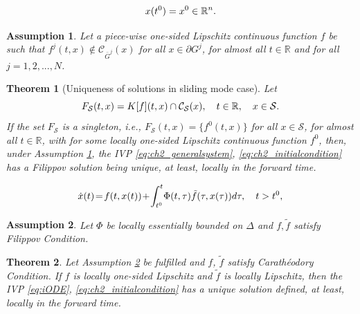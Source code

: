 \documentclass[10pt,a4paper]{amsart}
\newtheorem{assumption}{Assumption}
\newtheorem{theorem}{Theorem}
\newcommand{\R}{\mathbb{R}}
\begin{document}
\begin{equation} \label{eq:ch2_initialcondition}
	x(t^0)=x^0\in \R^n.\vspace{-1mm}
\end{equation} 

\begin{assumption}\label{as:uniq_1}\itshape
	Let  a piece-wise one-sided Lipschitz continuous function $f$ be such that 
		$f^j(t,x)\!\notin\! \mathcal{C}_{\bar G^j}(x)$ for all  $x\!\in\! \partial G^j$,
		for almost all $t\!\in\!\R$ and  for all $j\!=\!1,2,...,N$.
\end{assumption}

\begin{theorem}[\small Uniqueness of solutions in sliding mode case]\label{thm:unique_SM}\itshape
	Let\vspace{-1mm} 
		\begin{equation}
		F_{\mathcal{S}}(t,x)= K[f](t,x)\cap\mathcal{C}_{\mathcal{S}}(x), \quad t\in \R, \quad x\in \mathcal{S}.\vspace{-1mm}
		\end{equation}
 If the set 
  $F_{\mathcal{S}}$ is a singleton, i.e., $F_{\mathcal{S}}(t,x)=\{f^0(t,x)\}$ for all $x\in \mathcal{S}$, for almost all $t\in \R$, with
 for some locally {one-sided} Lipschitz continuous function $f^0$, then,  {under  Assumption \ref{as:uniq_1},}  
  the IVP  \eqref{eq:ch2_generalsystem}, \eqref{eq:ch2_initialcondition}  has a Filippov solution 
   being unique,  at least, locally in the forward time. 	
\end{theorem}

\begin{equation}\label{eq:iODE}
	\dot x(t)\!=\!f(t,x(t))\!+\!\int^t_{t^0} \!\Phi(t,\tau) \tilde f(\tau,x(\tau)) d\tau, \quad t>t^0,\vspace{-1mm}
\end{equation}

\begin{assumption}\label{as:ex_IDE}\itshape
		Let $\Phi$ be locally essentially bounded on $\Delta$ and $f,\tilde f$ satisfy Filippov Condition. 
\end{assumption}

\begin{theorem} \itshape \label{thm:uniqness_iODE} 	Let Assumption \ref{as:ex_IDE} be fulfilled and $f$, $\tilde f$ satisfy 
	Carath\'{e}\-odory  Condition. If $f$ is locally one-sided  Lipschitz  and $\tilde f$ is locally Lipschitz, then
  the IVP \eqref{eq:iODE}, \eqref{eq:ch2_initialcondition} has a  unique solution defined, at least, locally in the forward time. 
\end{theorem}	
\end{document}

